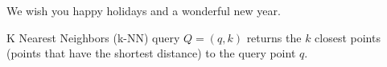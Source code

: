 


\newcommand{\subtitle}{\textbf{Exercise 8}}
\newcommand{\outdate}{11.12.2023}
\newcommand{\duedate}{01.01.2024 12:00 MEZ}
\newcommand{\video}{040}






\begin{center}
\textsf{We wish you happy holidays and a wonderful new year.}
\end{center}


K Nearest Neighbors (k-NN) query $Q=(q, k)$ returns the $k$ closest points (points that have the shortest distance) to the query point $q$.

